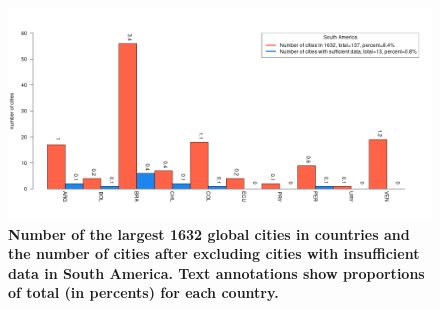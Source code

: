 \documentclass[preprint,10pt]{elsarticle} %
\begin{document}
\begin{figure}
\centering
\includegraphics[trim={ 0 35 25 50 },clip,scale=0.45]{Images2/South America_cities.png}
\caption{\bf Number of the largest 1632 global cities in countries and the number of cities after excluding cities with insufficient data in South America. Text annotations show proportions of total (in percents) for each country.}
 \label{fig:southhamerica}
\end{figure}
\end{document}
